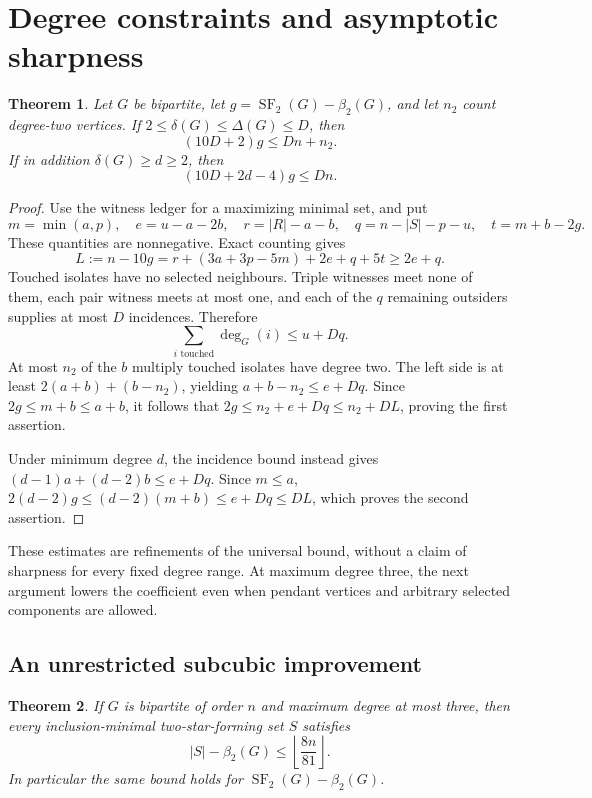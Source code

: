 \documentclass[11pt]{article}
\newtheorem{theorem}{Theorem}
\newcommand{\SF}{\operatorname{SF}_2}
\newcommand{\diss}{\beta_2}
\begin{document}
\section{Degree constraints and asymptotic sharpness}\label{sec:degree}

\begin{theorem}\label{thm:degree}
Let $G$ be bipartite, let $g=\SF(G)-\diss(G)$, and let $n_2$ count degree-two vertices.
If $2\le\delta(G)\le\Delta(G)\le D$, then
\[
 (10D+2)g\le Dn+n_2.
\]
If in addition $\delta(G)\ge d\ge2$, then
\[
 (10D+2d-4)g\le Dn.
\]
\end{theorem}
\begin{proof}
Use the witness ledger for a maximizing minimal set, and put
\[
 m=\min(a,p),\quad e=u-a-2b,\quad r=|R|-a-b,\quad
 q=n-|S|-p-u,\quad t=m+b-2g.
\]
These quantities are nonnegative. Exact counting gives
\[
 L:=n-10g=r+(3a+3p-5m)+2e+q+5t\ge2e+q.
\]
Touched isolates have no selected neighbours. Triple witnesses meet
none of them, each pair witness meets at most one, and each of the $q$
remaining outsiders supplies at most $D$ incidences. Therefore
\[
 \sum_{i\text{ touched}}\deg_G(i)\le u+Dq.
\]
At most $n_2$ of the $b$ multiply touched isolates have degree two.
The left side is at least $2(a+b)+(b-n_2)$, yielding
$a+b-n_2\le e+Dq$. Since $2g\le m+b\le a+b$, it follows that
$2g\le n_2+e+Dq\le n_2+DL$, proving the first assertion.

Under minimum degree $d$, the incidence bound instead gives
$(d-1)a+(d-2)b\le e+Dq$. Since $m\le a$,
$2(d-2)g\le(d-2)(m+b)\le e+Dq\le DL$,
which proves the second assertion.
\end{proof}

These estimates are refinements of the universal bound, without a claim
of sharpness for every fixed degree range. At maximum degree three,
the next argument lowers the coefficient even when pendant vertices
and arbitrary selected components are allowed.

\subsection{An unrestricted subcubic improvement}

\begin{theorem}\label{thm:subcubic}
If $G$ is bipartite of order $n$ and maximum degree at most three,
then every inclusion-minimal two-star-forming set $S$ satisfies
\[
 |S|-\diss(G)\le\left\lfloor\frac{8n}{81}\right\rfloor.
\]
In particular the same bound holds for $\SF(G)-\diss(G)$.
\end{theorem}
\end{document}
